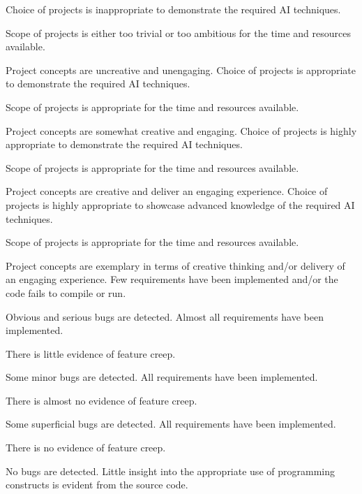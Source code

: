 \documentclass{../../fal_assignment}
\begin{document}
\rubricmasters
\begin{markingrubric}
%
        \grade\fail Choice of projects is inappropriate to demonstrate the required AI techniques.
            \par Scope of projects is either too trivial or too ambitious for the time and resources available.
            \par Project concepts are uncreative and unengaging.
        \grade Choice of projects is appropriate to demonstrate the required AI techniques.
            \par Scope of projects is appropriate for the time and resources available.
            \par Project concepts are somewhat creative and engaging.
        \grade Choice of projects is highly appropriate to demonstrate the required AI techniques.
            \par Scope of projects is appropriate for the time and resources available.
            \par Project concepts are creative and deliver an engaging experience.
        \grade Choice of projects is highly appropriate to showcase advanced knowledge of the required AI techniques.
            \par Scope of projects is appropriate for the time and resources available.
            \par Project concepts are exemplary in terms of creative thinking and/or delivery of an engaging experience.
%
        \grade \fail Few requirements have been implemented  and/or the code fails to compile or run.
            \par Obvious and serious bugs are detected.
        \grade Almost all requirements have been implemented.
            \par There is little evidence of feature creep.
            \par Some minor bugs  are detected.
        \grade All requirements have been implemented.
            \par There is almost no evidence of feature creep.
            \par Some superficial bugs are detected.
        \grade All requirements have been implemented.
            \par There is no evidence of feature creep.
            \par No bugs are detected.
%
        \grade \fail Little insight into the appropriate use of programming constructs is evident from the source code.

\end{markingrubric}
\end{document}
